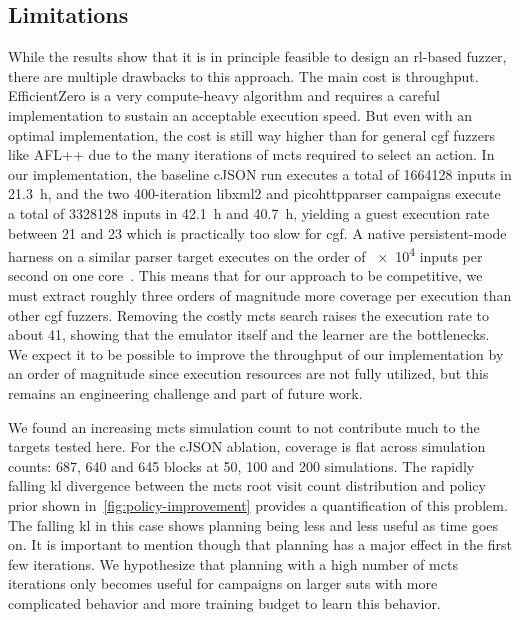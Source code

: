 \subsection{Limitations}

While the results show that it is in principle feasible to design an \gls{rl}-based fuzzer,
there are multiple drawbacks to this approach.
The main cost is throughput.
EfficientZero is a very compute-heavy algorithm and requires a careful implementation
to sustain an acceptable execution speed.
But even with an optimal implementation, the cost is still way higher than for
general \gls{cgf} fuzzers like AFL++ due to the many iterations of \gls{mcts}
required to select an action.
In our implementation, the baseline cJSON run executes a total of \num{1664128} inputs in \SI{21.3}{\hour},
and the two 400-iteration libxml2 and picohttpparser campaigns execute a total
of \num{3328128} inputs in \SI{42.1}{\hour} and \SI{40.7}{\hour}, yielding a guest execution rate between
\num{21} and \num{23} which is practically too slow for \gls{cgf}.
A native persistent-mode harness on a similar parser target executes on the order of \num{e4} inputs
per second on one core~\cite{fioraldi_afl_nodate}.
This means that for our approach to be competitive, we must extract roughly
three orders of magnitude more coverage per execution than other \gls{cgf}
fuzzers.
Removing the costly \gls{mcts} search raises the execution rate to about \num{41},
showing that the emulator itself and the learner are the bottlenecks.
We expect it to be possible to improve the throughput of our implementation by
an order of magnitude since execution resources are not fully utilized, but
this remains an engineering challenge and part of future work.

We found an increasing \gls{mcts} simulation count to not contribute much to the
targets tested here.
For the cJSON ablation, coverage is flat across simulation counts: \num{687}, \num{640} and \num{645} blocks at 50, 100
and 200 simulations.
The rapidly falling \gls{kl} divergence between the \gls{mcts} root visit count
distribution and policy prior shown in~\cref{fig:policy-improvement} provides a
quantification of this problem.
The falling \gls{kl} in this case shows planning being less and less useful as time goes on.
It is important to mention though that planning has a major effect in the first few iterations.
We hypothesize that planning with a high number of \gls{mcts} iterations only
becomes useful for campaigns on larger \glspl{sut} with more complicated behavior and
more training budget to learn this behavior.

